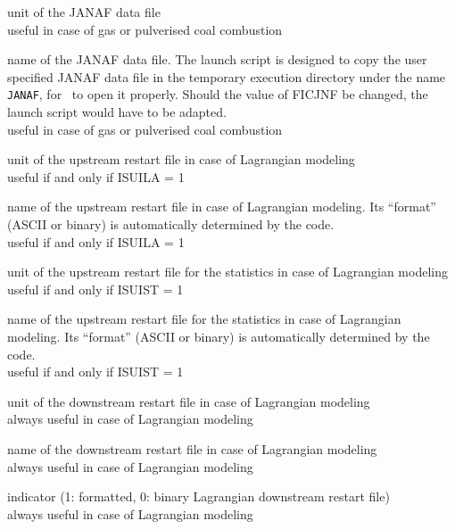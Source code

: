 {unit of the JANAF data file\\
useful in case of gas or pulverised coal combustion}

{name of the JANAF data file. The launch script is designed to copy the
user specified JANAF data file in the temporary execution directory
under the name \texttt{JANAF}, for \CS\ to open it properly. Should the value
of FICJNF be changed, the launch script would have to be adapted.\\
useful in case of gas or pulverised coal combustion}


{unit of the upstream restart file in case of Lagrangian modeling\\
useful if and only if ISUILA = 1}

{name of the upstream restart file in case of Lagrangian modeling.
Its ``format'' (ASCII or
binary) is automatically determined by the code.\\
useful if and only if ISUILA = 1}

{unit of the upstream restart file for the statistics in case of
Lagrangian modeling\\
useful if and only if ISUIST = 1}

{name of the upstream restart file for the statistics in case of
Lagrangian modeling. Its ``format'' (ASCII or
binary) is automatically determined by the code.\\
useful if and only if ISUIST = 1}

{unit of the downstream restart file in case of Lagrangian modeling\\
always useful in case of Lagrangian modeling}

{name of the downstream restart file in case of Lagrangian modeling\\
always useful in case of Lagrangian modeling}

{indicator (1: formatted, 0: binary Lagrangian downstream restart file)\\
always useful in case of Lagrangian modeling}

